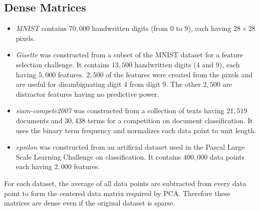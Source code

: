 \documentclass[11pt]{article}
\numberwithin{equation}{section}
\numberwithin{figure}{section}
\numberwithin{table}{section}
\begin{document}

\subsection{Dense Matrices}
\label{dense_mat}
\begin{itemize}
\item \textit{MNIST} \cite{MNIST} contains $70,000$ handwritten digits (from 0 to 9), each having $28 \times 28$ pixels.
\item \textit{Gisette} \cite{UCI_data} was constructed from a subset of the MNIST dataset for a feature selection challenge. It contains $13,500$ handwritten digits (4 and 9), each having $5,000$ features. $2,500$ of the features were created from the pixels and are useful for disambiguating digit 4 from digit 9. The other $2,500$ are distractor features having no predictive power.    
\item \textit{siam-compete2007} \cite{LIBSVM} was constructed from a collection of texts having $21,519$ documents and $30,438$ terms for a competition on document classification. It uses the binary term frequency and normalizes each data point to unit length.
\item \textit{epsilon} \cite{LIBSVM} was constructed from an artificial dataset used in the Pascal Large Scale Learning Challenge on classification. It contains $400,000$ data points each having $2,000$ features. 
\end{itemize}

For each dataset, the average of all data points are subtracted from every data point to form the centered data matrix required by PCA. Therefore these matrices are dense even if the original dataset is sparse.
\end{document}
